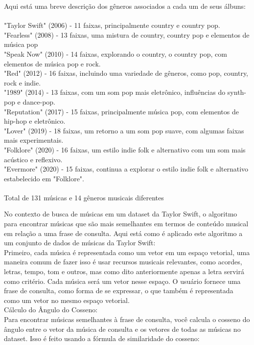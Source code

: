 \documentclass[a4paper,12pt]{article}
\begin{document}
Aqui está uma breve descrição dos gêneros associados a cada um de seus álbuns:\\\\
"Taylor Swift" (2006) - 11 faixas, principalmente country e country pop.\\
"Fearless" (2008) - 13 faixas, uma mistura de country, country pop e elementos de música pop \\
"Speak Now" (2010) - 14 faixas, explorando o country, o country pop, com elementos de música pop e rock.\\
"Red" (2012) - 16 faixas, incluindo uma variedade de gêneros, como pop, country, rock e indie.\\
"1989" (2014) - 13 faixas, com um som pop mais eletrônico, influências do synth-pop e dance-pop.\\
"Reputation" (2017) - 15 faixas, principalmente música pop, com elementos de hip-hop e eletrônico.\\
"Lover" (2019) - 18 faixas, um retorno a um som pop suave, com algumas faixas mais experimentais.\\
"Folklore" (2020) - 16 faixas, um estilo indie folk e alternativo com um som mais acústico e reflexivo.\\
"Evermore" (2020) - 15 faixas, continua a explorar o estilo indie folk e alternativo estabelecido em "Folklore".\\\\
Total de 131 músicas e 14 gêneros musicais diferentes\\
\pagebreak


No contexto de busca de músicas em um dataset da Taylor Swift, o algoritmo para encontrar músicas que são mais semelhantes em termos de conteúdo musical em relação a uma frase de consulta. Aqui está como é aplicado este algoritmo a um conjunto de dados de músicas da Taylor Swift:\\

Primeiro, cada música é representada como um vetor em um espaço vetorial, uma maneira comum de fazer isso é usar recursos musicais relevantes, como acordes, letras, tempo, tom e outros, mas como dito anteriormente apenas a letra servirá como critério. Cada música será um vetor nesse espaço. O usuário fornece uma frase de consulta, como forma de se expressar, o que também é representada como um vetor no mesmo espaço vetorial.\\

Cálculo do Ângulo do Cosseno:\\
Para encontrar músicas semelhantes à frase de consulta, você calcula o cosseno do ângulo entre o vetor da música de consulta e os vetores de todas as músicas no dataset. Isso é feito usando a fórmula de similaridade do cosseno:\\
\end{document}
